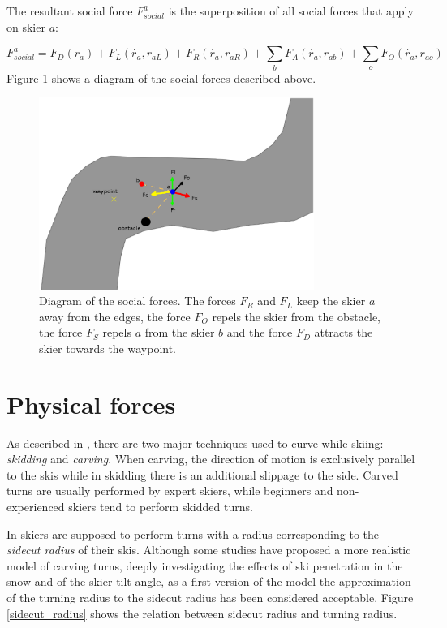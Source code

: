 \documentclass[12pt,a4paper,twoside]{book}
\begin{document}
The resultant social force $F^a_{social}$ is the superposition of all social forces that apply on skier $a$:

\begin{equation}
F^a_{social}=F_D(r_a)+F_L(\dot{r_a},r_{aL})+F_R(\dot{r_a},r_{aR})+\sum_b F_A(\dot{r_a},r_{ab})+\sum_o F_O(\dot{r_a},r_{ao})\nonumber
\end{equation}
Figure \ref{social_forces_diagram} shows a diagram of the social forces described above.

\begin{figure}
  \begin{center}
    \includegraphics[width=0.8\textwidth]{images/social_forces_dia.eps}
    \caption{Diagram of the social forces. The forces $F_R$ and $F_L$ keep the skier $a$ away from the edges, the force $F_O$ repels the skier from the obstacle, the force $F_S$ repels $a$ from the skier $b$ and the force $F_D$ attracts the skier towards the waypoint.}\label{social_forces_diagram}
  \end{center}
\end{figure}


\section{Physical forces}
As described in \cite{hol2012}, there are two major techniques used to curve while skiing: \textit{skidding} and \textit{carving}. When carving, the direction of motion is exclusively parallel to the skis while in skidding there is an additional slippage to the side. Carved turns are usually performed by expert skiers, while beginners and non-experienced skiers tend to perform skidded turns.

In \cite{hol2012} skiers are supposed to perform turns with a radius corresponding to the \textit{sidecut radius} of their skis. Although some studies \cite{jen2004} \cite{fe2010} have proposed a more realistic model of carving turns, deeply investigating the effects of ski penetration in the snow and of the skier tilt angle, as a first version of the model the approximation of the turning radius to the sidecut radius has been considered acceptable. Figure \ref{sidecut_radius} shows the relation between sidecut radius and turning radius.
\end{document}
